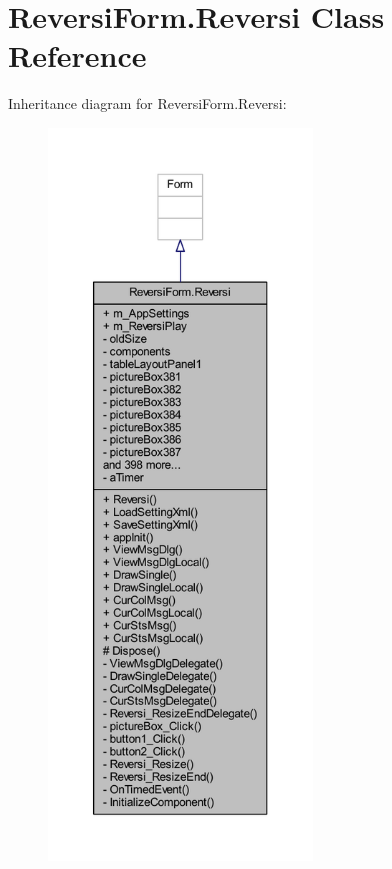 \hypertarget{class_reversi_form_1_1_reversi}{}\section{Reversi\+Form.\+Reversi Class Reference}
\label{class_reversi_form_1_1_reversi}


Inheritance diagram for Reversi\+Form.\+Reversi\+:\nopagebreak
\begin{figure}[H]
\begin{center}
\leavevmode
\includegraphics[height=550pt]{class_reversi_form_1_1_reversi__inherit__graph}
\end{center}
\end{figure}


